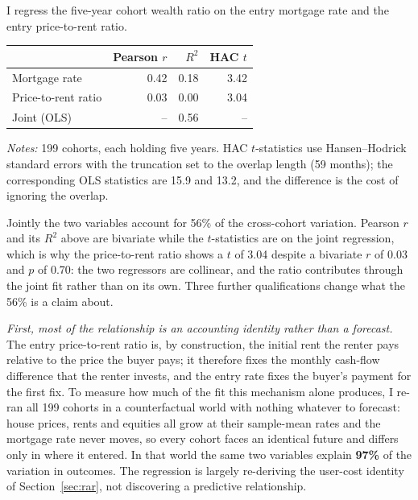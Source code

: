 I regress the five-year cohort wealth ratio on the entry mortgage rate and the entry price-to-rent ratio.

\begin{center}
\begin{threeparttable}
\begin{tabular}{lrrr}
\toprule
 & \textbf{Pearson $r$} & \textbf{$R^2$} & \textbf{HAC $t$} \\
\midrule
Mortgage rate       & 0.42 & 0.18 & 3.42 \\
Price-to-rent ratio & 0.03 & 0.00 & 3.04 \\
Joint (OLS)         & --   & 0.56 & --   \\
\bottomrule
\end{tabular}
\begin{tablenotes}
  \small
  \item \textit{Notes:} 199 cohorts, each holding five years. HAC $t$-statistics use Hansen--Hodrick standard errors with the truncation set to the overlap length (59 months); the corresponding OLS statistics are 15.9 and 13.2, and the difference is the cost of ignoring the overlap.
\end{tablenotes}
\end{threeparttable}
\end{center}

Jointly the two variables account for 56\% of the cross-cohort variation. Pearson $r$ and its $R^2$ above are bivariate while the $t$-statistics are on the joint regression, which is why the price-to-rent ratio shows a $t$ of 3.04 despite a bivariate $r$ of 0.03 and $p$ of 0.70: the two regressors are collinear, and the ratio contributes through the joint fit rather than on its own. Three further qualifications change what the 56\% is a claim about.

\emph{First, most of the relationship is an accounting identity rather than a forecast.} The entry price-to-rent ratio is, by construction, the initial rent the renter pays relative to the price the buyer pays; it therefore fixes the monthly cash-flow difference that the renter invests, and the entry rate fixes the buyer's payment for the first fix. To measure how much of the fit this mechanism alone produces, I re-ran all 199 cohorts in a counterfactual world with nothing whatever to forecast: house prices, rents and equities all grow at their sample-mean rates and the mortgage rate never moves, so every cohort faces an identical future and differs only in where it entered. In that world the same two variables explain \textbf{97\%} of the variation in outcomes. The regression is largely re-deriving the user-cost identity of Section~\ref{sec:rar}, not discovering a predictive relationship.


